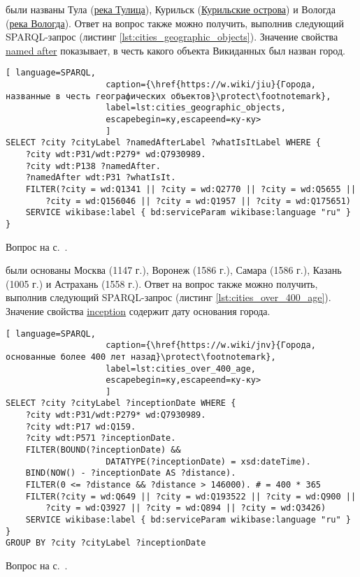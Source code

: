\begin{task}
    \label{answer:cities_geographic_objects}
     были названы Тула (\href{https://bit.ly/36pMqht}{река Тулица}), Курильск (\href{https://bit.ly/3pbEr0p}{Курильские острова}) и Вологда (\href{https://bit.ly/3lipZB3}{река Вологда}). Ответ на вопрос также можно получить, выполнив следующий SPARQL-запрос (листинг \ref{lst:cities_geographic_objects}). Значение свойства \href{https://www.wikidata.org/wiki/Property:P138}{named after} показывает, в честь какого объекта Викиданных был назван город.
    \begin{lstlisting}[ language=SPARQL, 
                    caption={\href{https://w.wiki/jiu}{Города, названные в честь географических объектов}\protect\footnotemark},
                    label=lst:cities_geographic_objects, 
                    escapebegin=ку,escapeend=ку-ку>
                    ]
SELECT ?city ?cityLabel ?namedAfterLabel ?whatIsItLabel WHERE {
	?city wdt:P31/wdt:P279* wd:Q7930989.
	?city wdt:P138 ?namedAfter.
	?namedAfter wdt:P31 ?whatIsIt.
	FILTER(?city = wd:Q1341 || ?city = wd:Q2770 || ?city = wd:Q5655 ||
		?city = wd:Q156046 || ?city = wd:Q1957 || ?city = wd:Q175651)
	SERVICE wikibase:label { bd:serviceParam wikibase:language "ru" }
}
    \end{lstlisting}
    \small{Вопрос на с.~\pageref{lst:population_town}.}
\end{task}

\begin{task}
    \label{answer:cities_over_400_age}
     были основаны Москва (1147 г.), Воронеж (1586 г.), Самара (1586 г.), Казань (1005 г.) и Астрахань (1558 г.). Ответ на вопрос также можно получить, выполнив следующий SPARQL-запрос (листинг \ref{lst:cities_over_400_age}). Значение свойства \href{https://www.wikidata.org/wiki/Property:P571}{inception} содержит дату основания города.
    \begin{lstlisting}[ language=SPARQL, 
                    caption={\href{https://w.wiki/jnv}{Города, основанные более 400 лет назад}\protect\footnotemark},
                    label=lst:cities_over_400_age, 
                    escapebegin=ку,escapeend=ку-ку>
                    ]
SELECT ?city ?cityLabel ?inceptionDate WHERE {
	?city wdt:P31/wdt:P279* wd:Q7930989.
	?city wdt:P17 wd:Q159.
	?city wdt:P571 ?inceptionDate.
	FILTER(BOUND(?inceptionDate) && 
					DATATYPE(?inceptionDate) = xsd:dateTime).
	BIND(NOW() - ?inceptionDate AS ?distance).
	FILTER(0 <= ?distance && ?distance > 146000). # = 400 * 365
	FILTER(?city = wd:Q649 || ?city = wd:Q193522 || ?city = wd:Q900 ||
		?city = wd:Q3927 || ?city = wd:Q894 || ?city = wd:Q3426)
	SERVICE wikibase:label { bd:serviceParam wikibase:language "ru" }
}
GROUP BY ?city ?cityLabel ?inceptionDate    
\end{lstlisting}

    \small{Вопрос на с.~\pageref{fig:city_relation_Russia_S_N}.}
\end{task}


